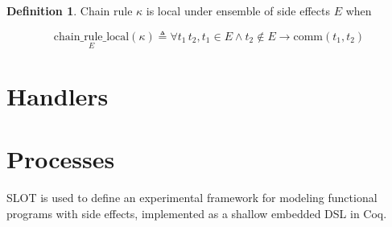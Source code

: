 \documentclass[10pt,letterpaper]{article}
\newcommand \comm[2]{\mathrel{\text{comm}\left(#1,#2\right)}}
\newcommand \crlocal[2]{\mathrel{\underset{#1}{\text{chain\_rule\_local}}\left(#2\right)}}
\theoremstyle{definition}
\newtheorem{definition}{Definition}
\begin{document}
\begin{definition}
  Chain rule $\kappa$ is local under ensemble of side effects $E$ when

  \begin{equation}
    \crlocal{E}{\kappa} \triangleq \forall t_1\, t_2, t_1 \in E \land t_2 \notin E \to \comm{t_1}{t_2}
  \end{equation}
\end{definition}


\section{Handlers}

\section{Processes}

SLOT is used to define an experimental framework for modeling
functional programs with side effects, implemented as a shallow
embedded DSL in Coq.
\end{document}
